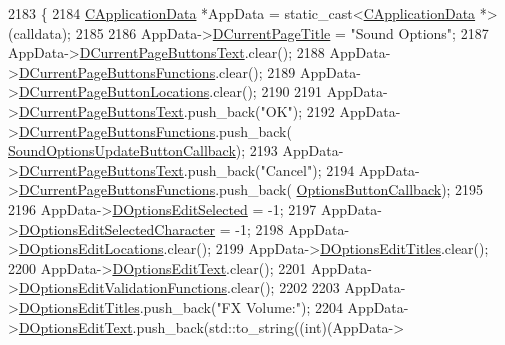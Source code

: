 \begin{DoxyCode}
2183                                                                \{
2184     \hyperlink{classCApplicationData}{CApplicationData} *AppData = \textcolor{keyword}{static\_cast<}\hyperlink{classCApplicationData}{CApplicationData} *\textcolor{keyword}{>}(calldata);
2185     
2186     AppData->\hyperlink{classCApplicationData_a49ce7f0b5891f0f2c29b73aad636b761}{DCurrentPageTitle} = \textcolor{stringliteral}{"Sound Options"};
2187     AppData->\hyperlink{classCApplicationData_af04b7f5f8ba4e5c99c0a3530055fc15d}{DCurrentPageButtonsText}.clear();
2188     AppData->\hyperlink{classCApplicationData_ad3079e5563a19d21c1e4ceff2a188382}{DCurrentPageButtonsFunctions}.clear();
2189     AppData->\hyperlink{classCApplicationData_a3615df8e23cea3ce17f11cf61340a7b4}{DCurrentPageButtonLocations}.clear();
2190     
2191     AppData->\hyperlink{classCApplicationData_af04b7f5f8ba4e5c99c0a3530055fc15d}{DCurrentPageButtonsText}.push\_back(\textcolor{stringliteral}{"OK"});
2192     AppData->\hyperlink{classCApplicationData_ad3079e5563a19d21c1e4ceff2a188382}{DCurrentPageButtonsFunctions}.push\_back(
      \hyperlink{classCApplicationData_ae63c8ca19ddeb92a3aaf0a5d67d09e58}{SoundOptionsUpdateButtonCallback});
2193     AppData->\hyperlink{classCApplicationData_af04b7f5f8ba4e5c99c0a3530055fc15d}{DCurrentPageButtonsText}.push\_back(\textcolor{stringliteral}{"Cancel"});
2194     AppData->\hyperlink{classCApplicationData_ad3079e5563a19d21c1e4ceff2a188382}{DCurrentPageButtonsFunctions}.push\_back(
      \hyperlink{classCApplicationData_a3647cf78eb59689b901d4204c81555b4}{OptionsButtonCallback});
2195     
2196     AppData->\hyperlink{classCApplicationData_aee4aa5eb5b89b86eb2648d0f9c7358f9}{DOptionsEditSelected} = -1;
2197     AppData->\hyperlink{classCApplicationData_a921d69021fc61e51d12d8a26a5ac1a89}{DOptionsEditSelectedCharacter} = -1;
2198     AppData->\hyperlink{classCApplicationData_ab4e6804c6e50cca45ab3c3071588da34}{DOptionsEditLocations}.clear();
2199     AppData->\hyperlink{classCApplicationData_a7a322ef6b8c1db3e995c6b493230fd05}{DOptionsEditTitles}.clear();
2200     AppData->\hyperlink{classCApplicationData_a7044dc34cbd9d6776e8ef79eb12b5ce4}{DOptionsEditText}.clear();
2201     AppData->\hyperlink{classCApplicationData_ab76fa444142de66fdb058f390e01112c}{DOptionsEditValidationFunctions}.clear();
2202     
2203     AppData->\hyperlink{classCApplicationData_a7a322ef6b8c1db3e995c6b493230fd05}{DOptionsEditTitles}.push\_back(\textcolor{stringliteral}{"FX Volume:"});
2204     AppData->\hyperlink{classCApplicationData_a7044dc34cbd9d6776e8ef79eb12b5ce4}{DOptionsEditText}.push\_back(std::to\_string((\textcolor{keywordtype}{int})(AppData->

\end{DoxyCode}
